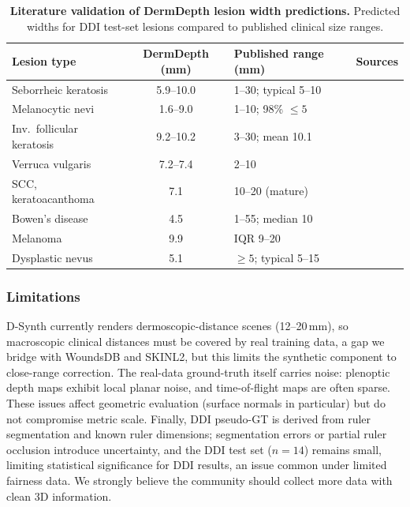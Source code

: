 \documentclass[11pt]{ucthesis}
\begin{document}
\begin{table}[t]
\centering
\caption{\textbf{Literature validation of DermDepth lesion width predictions.} Predicted widths for DDI test-set lesions compared to published clinical size ranges.}
\label{tab:dd_litval}
\small
\setlength\tabcolsep{4pt}
\begin{tabular}{@{}l c l c@{}}
\toprule
Lesion type & DermDepth (mm) & Published range (mm) & Sources \\
\midrule
Seborrheic keratosis      & 5.9--10.0 & 1--30; typical 5--10           & \cite{greco-2024,barthelmann-2023} \\
Melanocytic nevi           & 1.6--9.0  & 1--10; 98\% $\leq 5$          & \cite{iyidal-2016,muradia-2022} \\
Inv.\ follicular keratosis & 9.2--10.2 & 3--30; mean 10.1  & \cite{hamzelou-2025} \\
Verruca vulgaris           & 7.2--7.4  & 2--10 & \cite{aboud-2023} \\
SCC, keratoacanthoma       & 7.1       & 10--20 (mature) & \cite{zito-2023} \\
Bowen's disease            & 4.5       & 1--55; median 10 & \cite{fougelberg-2021} \\
Melanoma                   & 9.9       & IQR 9--20 & \cite{dessinioti-2024} \\
Dysplastic nevus           & 5.1       & $\geq 5$; typical 5--15 & \cite{baigrie-2022} \\
\bottomrule
\end{tabular}
\end{table}

\subsubsection{Limitations}\label{sec:dd_limits}
D-Synth currently renders dermoscopic-distance scenes (12--20\,mm), so macroscopic clinical distances must be covered by real training data, a gap we bridge with WoundsDB and SKINL2, but this limits the synthetic component to close-range correction. The real-data ground-truth itself carries noise: plenoptic depth maps exhibit local planar noise, and time-of-flight maps are often sparse. These issues affect geometric evaluation (surface normals in particular) but do not compromise metric scale. Finally, DDI pseudo-GT is derived from ruler segmentation and known ruler dimensions; segmentation errors or partial ruler occlusion introduce uncertainty, and the DDI test set ($n{=}14$) remains small, limiting statistical significance for DDI results, an issue common under limited fairness data. We strongly believe the community should collect more data with clean 3D information.
\end{document}
